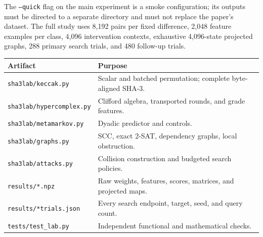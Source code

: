 \documentclass[11pt]{article}
\begin{document}
The \texttt{--quick} flag on the main experiment is a smoke configuration; its outputs must be directed to a separate directory and must not replace the paper's dataset. The full study uses 8,192 pairs per fixed difference, 2,048 feature examples per class, 4,096 intervention contexts, exhaustive 4,096-state projected graphs, 288 primary search trials, and 480 follow-up trials.

\begin{center}\small
\begin{tabular}{p{.40\linewidth}p{.52\linewidth}}
\toprule
Artifact & Purpose\\
\midrule
\texttt{sha3lab/keccak.py} & Scalar and batched permutation; complete byte-aligned SHA-3.\\
\texttt{sha3lab/hypercomplex.py} & Clifford algebra, transported rounds, and grade features.\\
\texttt{sha3lab/metamarkov.py} & Dyadic predictor and controls.\\
\texttt{sha3lab/graphs.py} & SCC, exact 2-SAT, dependency graphs, local obstruction.\\
\texttt{sha3lab/attacks.py} & Collision construction and budgeted search policies.\\
\texttt{results/*.npz} & Raw weights, features, scores, matrices, and projected maps.\\
\texttt{results/*trials.json} & Every search endpoint, target, seed, and query count.\\
\texttt{tests/test\_lab.py} & Independent functional and mathematical checks.\\
\bottomrule
\end{tabular}
\end{center}
\end{document}
